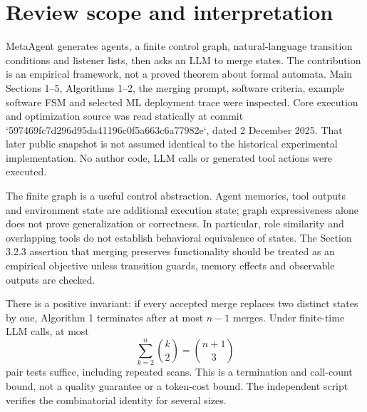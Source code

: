 \documentclass[10pt]{article}
\begin{document}
\section*{Review scope and interpretation}
MetaAgent generates agents, a finite control graph, natural-language transition conditions and listener lists, then asks an LLM to merge states. The contribution is an empirical framework, not a proved theorem about formal automata. Main Sections 1–5, Algorithms 1–2, the merging prompt, software criteria, example software FSM and selected ML deployment trace were inspected. Core execution and optimization source was read statically at commit `597469fc7d296d95da41196c0f5a663c6a77982e`, dated 2 December 2025. That later public snapshot is not assumed identical to the historical experimental implementation. No author code, LLM calls or generated tool actions were executed.\par
The finite graph is a useful control abstraction. Agent memories, tool outputs and environment state are additional execution state; graph expressiveness alone does not prove generalization or correctness. In particular, role similarity and overlapping tools do not establish behavioral equivalence of states. The Section 3.2.3 assertion that merging preserves functionality should be treated as an empirical objective unless transition guards, memory effects and observable outputs are checked.\par
There is a positive invariant: if every accepted merge replaces two distinct states by one, Algorithm 1 terminates after at most \(n-1\) merges. Under finite-time LLM calls, at most \[\sum_{k=2}^{n}\binom{k}{2}=\binom{n+1}{3}\] pair tests suffice, including repeated scans. This is a termination and call-count bound, not a quality guarantee or a token-cost bound. The independent script verifies the combinatorial identity for several sizes.\par
\end{document}
